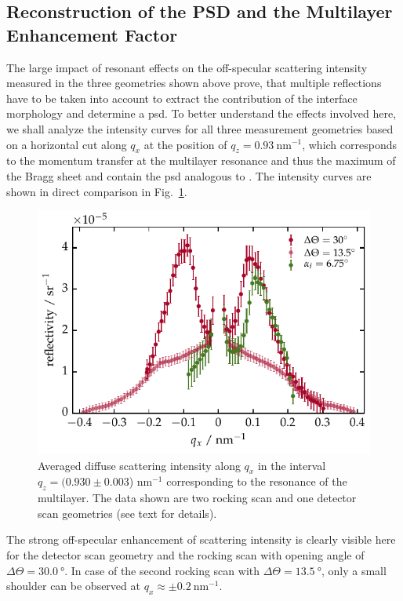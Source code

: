 \subsection{Reconstruction of the PSD and the Multilayer Enhancement Factor}
\label{ch_diff:sec_determination_of_the_psd}
The large impact of resonant effects on the off-specular scattering intensity measured in the three geometries shown above prove, that multiple reflections have to be taken into account to extract the contribution of the interface morphology and determine a \gls{psd}. To better understand the effects involved here, we shall analyze the intensity curves for all three measurement geometries based on a horizontal cut along $q_x$ at the position of $q_z=\SI{0.93}{\nano\meter^{-1}}$, which corresponds to the momentum transfer at the multilayer resonance and thus the maximum of the Bragg sheet and contain the \gls{psd} analogous to \textcite{siffalovic_characterization_2009}. The intensity curves are shown in direct comparison in Fig.~\ref{ch_diff:fig_PTB17_qx_cuts_different_geometries}.
\begin{figure}[htbp]
	\includegraphics{img/PTB17_diffuse_BraggSheet_DetectorAndRocking} \caption{Averaged diffuse scattering intensity along $q_x$ in the interval  $q_z=(0.930 \pm 0.003$) nm$^{-1}$ corresponding to the resonance of the multilayer. The data shown are two rocking scan and one detector scan geometries (see text for details).} \label{ch_diff:fig_PTB17_qx_cuts_different_geometries}
\end{figure}
The strong off-specular enhancement of scattering intensity is clearly visible here for the detector scan geometry and the rocking scan with opening angle of $\Delta\Theta = \SI{30.0}{\degree}$. In case of the second rocking scan with $\Delta\Theta = \SI{13.5}{\degree}$, only a small shoulder can be observed at $q_x \approx \pm \SI{0.2}{\nano\meter^{-1}}$.

